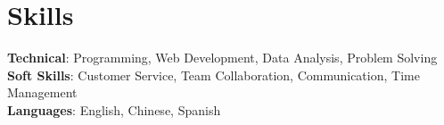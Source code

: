 \documentclass[letterpaper,11pt]{article}
\begin{document}
\section{Skills}
 \begin{itemize}[leftmargin=0.15in, label={}]
    \small{\item{
     \textbf{Technical}{: Programming, Web Development, Data Analysis, Problem Solving} \\
     \textbf{Soft Skills}{: Customer Service, Team Collaboration, Communication, Time Management} \\
     \textbf{Languages}{: English, Chinese, Spanish}
    }}
 \end{itemize}


\end{document}
